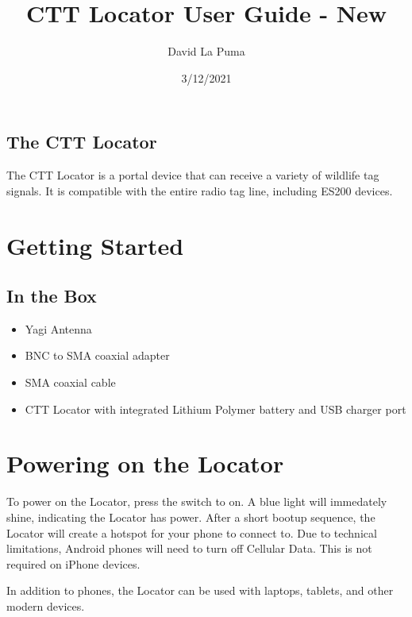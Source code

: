 \documentclass[
]{article}
\title{CTT Locator User Guide - New}
\author{David La Puma}
\date{3/12/2021}
\providecommand{\tightlist}{%
  \setlength{\itemsep}{0pt}\setlength{\parskip}{0pt}}
\begin{document}
\maketitle

{
\setcounter{tocdepth}{2}
\tableofcontents
}
\hypertarget{the-ctt-locator}{%
\subsection{The CTT Locator}\label{the-ctt-locator}}

The CTT Locator is a portal device that can receive a variety of
wildlife tag signals. It is compatible with the entire radio tag line,
including ES200 devices.

\hypertarget{getting-started}{%
\section{Getting Started}\label{getting-started}}

\hypertarget{in-the-box}{%
\subsection{In the Box}\label{in-the-box}}

\begin{itemize}
\tightlist
\item
  Yagi Antenna
\item
  BNC to SMA coaxial adapter
\item
  SMA coaxial cable
\item
  CTT Locator with integrated Lithium Polymer battery and USB charger
  port
\end{itemize}

\hypertarget{powering-on-the-locator}{%
\section{Powering on the Locator}\label{powering-on-the-locator}}

To power on the Locator, press the switch to on. A blue light will
immedately shine, indicating the Locator has power. After a short bootup
sequence, the Locator will create a hotspot for your phone to connect
to. Due to technical limitations, Android phones will need to turn off
Cellular Data. This is not required on iPhone devices.

In addition to phones, the Locator can be used with laptops, tablets,
and other modern devices.
\end{document}
